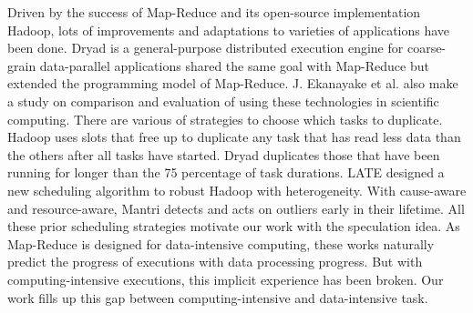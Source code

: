 Driven by the success of Map-Reduce \cite{dean} and its open-source implementation Hadoop,
lots of improvements \cite{Zaharia:2008:IMP:1855741.1855744}
\cite{Ananthanarayanan:2010:ROM:1924943.1924962} and adaptations
\cite{Srirama:2012:ASC:2304777.2304882} to varieties of applications have been done. Dryad
\cite{Isard:2007:DDD:1272998.1273005} is a general-purpose distributed execution engine
for coarse-grain data-parallel applications shared the same goal with Map-Reduce but
extended the programming model of Map-Reduce. J. Ekanayake et al.
\cite{Ekanayake:2011:CTB:1990761.1990858} also make a study on comparison and evaluation
of using these technologies in scientific computing. There are various of strategies to
choose which tasks to duplicate. Hadoop uses slots that free up to duplicate any task that
has read less data than the others after all tasks have started. Dryad duplicates those
that have been running for longer than the 75 percentage of task durations. LATE
\cite{Zaharia:2008:IMP:1855741.1855744} designed a new scheduling algorithm to robust
Hadoop with heterogeneity. With cause-aware and resource-aware, Mantri
\cite{Ananthanarayanan:2010:ROM:1924943.1924962} detects and acts on outliers early in
their lifetime. All these prior scheduling strategies motivate our work with the
speculation idea. As Map-Reduce is designed for data-intensive computing, these works
naturally predict the progress of executions with data processing progress. But with
computing-intensive executions, this implicit experience has been broken. Our work fills
up this gap between computing-intensive and data-intensive task.


